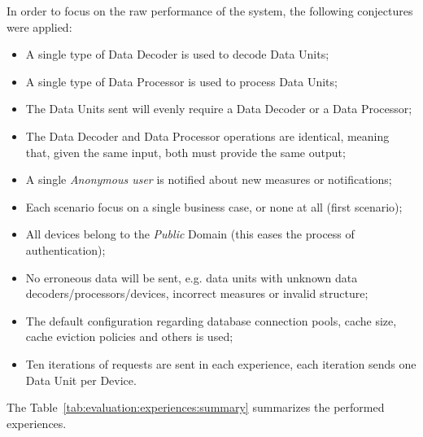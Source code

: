 In order to focus on the raw performance of the system, the following conjectures were applied:

\begin{itemize}
    \item A single type of Data Decoder is used to decode Data Units;
    \item A single type of Data Processor is used to process Data Units;
    \item The Data Units sent will evenly require a Data Decoder or a Data Processor;
    \item The Data Decoder and Data Processor operations are identical, meaning that, given the same input, both must provide the same output;
    \item A single \textit{Anonymous user} is notified about new measures or notifications;
    \item Each scenario focus on a single business case, or none at all (first scenario);
    \item All devices belong to the \textit{Public} Domain (this eases the process of authentication);
    \item No erroneous data will be sent, e.g. data units with unknown data decoders/processors/devices, incorrect measures or invalid structure;
    \item The default configuration regarding database connection pools, cache size, cache eviction policies and others is used;
    \item Ten iterations of requests are sent in each experience, each iteration sends one Data Unit per Device.
\end{itemize}

The Table~\ref{tab:evaluation:experiences:summary} summarizes the performed experiences.

